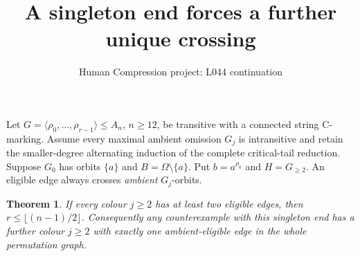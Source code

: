 \documentclass[11pt,a4paper]{article}
\title{A singleton end forces a further unique crossing}
\author{Human Compression project: L044 continuation}
\date{}
\newtheorem{theorem}{Theorem}
\newcommand{\gen}[1]{\langle#1\rangle}
\begin{document}
\maketitle
Let $G=\gen{\rho_0,\ldots,\rho_{r-1}}\le A_n$, $n\ge12$,
be transitive with a connected string C-marking. Assume every
maximal ambient omission $G_j$ is intransitive and retain the
smaller-degree alternating induction of the complete critical-tail
reduction. Suppose $G_0$ has orbits $\{a\}$ and
$B=\Omega\setminus\{a\}$. Put $b=a^{\rho_0}$ and
$H=G_{\ge2}$. An eligible edge always crosses \emph{ambient}
$G_j$-orbits.

\begin{theorem}
If every colour $j\ge2$ has at least two eligible edges, then
$r\le\lfloor(n-1)/2\rfloor$. Consequently any counterexample
with this singleton end has a further colour $j\ge2$ with exactly
one ambient-eligible edge in the whole permutation graph.
\end{theorem}
\end{document}
